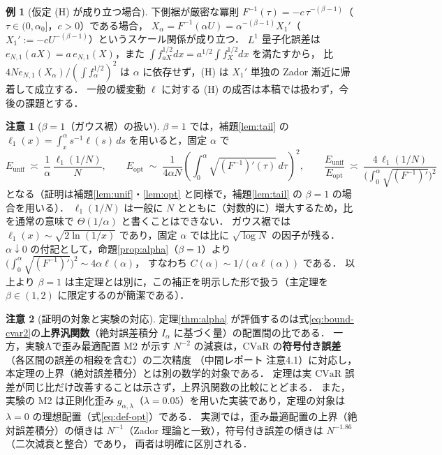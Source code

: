 \documentclass[a4paper,10pt]{jsarticle}
\theoremstyle{definition}
\newtheorem{remark}{注意}[section]
\newtheorem{example}{例}[section]
\newcommand{\CVaR}{\mathrm{CVaR}}
\newcommand{\Finv}{F^{-1}}
\newcommand{\eN}{e_{N,1}}
\newcommand{\Eunif}{E_{\mathrm{unif}}}
\newcommand{\Eopt}{E_{\mathrm{opt}}}
\begin{document}
\begin{example}[仮定 (H) が成り立つ場合]
\label{ex:powertail}
下側裾が厳密な冪則 $\Finv(\tau)=-c\,\tau^{-(\beta-1)}$（$\tau\in(0,\alpha_0]$，$c>0$）である場合，
$X_\alpha=\Finv(\alpha U)=\alpha^{-(\beta-1)}X_1'$（$X_1':=-cU^{-(\beta-1)}$）というスケール関係が成り立つ．
$L^1$ 量子化誤差は $\eN(aX)=a\,\eN(X)$，また $\int f_{aX}^{1/2}dx=a^{1/2}\int f_X^{1/2}dx$ を満たすから，
比 $4N\eN(X_\alpha)/(\int f_\alpha^{1/2})^2$ は $\alpha$ に依存せず，(H) は $X_1'$ 単独の Zador 漸近に帰着して成立する．
一般の緩変動 $\ell$ に対する (H) の成否は本稿では扱わず，今後の課題とする．
\end{example}

\begin{remark}[$\beta=1$（ガウス裾）の扱い]
\label{rem:beta1}
$\beta=1$ では，補題\ref{lem:tail} の $\ell_1(x)=\int_x^\alpha s^{-1}\ell(s)\,ds$ を用いると，固定 $\alpha$ で
\begin{equation*}
  \Eunif\;\asymp\;\frac1\alpha\,\frac{\ell_1(1/N)}{N},\qquad
  \Eopt\;\sim\;\frac1{4\alpha N}\left(\int_0^\alpha\sqrt{(\Finv)'(\tau)}\,d\tau\right)^{2},\qquad
  \frac{\Eunif}{\Eopt}\;\asymp\;\frac{4\,\ell_1(1/N)}{\bigl(\int_0^\alpha\sqrt{(\Finv)'}\bigr)^{2}}
\end{equation*}
となる（証明は補題\ref{lem:unif}・\ref{lem:opt} と同様で，補題\ref{lem:tail} の $\beta=1$ の場合を用いる）．
$\ell_1(1/N)$ は一般に $N$ とともに（対数的に）増大するため，比を通常の意味で $\Theta(1/\alpha)$ と書くことはできない．
ガウス裾では $\ell_1(x)\sim\sqrt{2\ln(1/x)}$ であり，固定 $\alpha$ では比に $\sqrt{\log N}$ の因子が残る．
$\alpha\downarrow0$ の付記として，命題\ref{prop:alpha}（$\beta=1$）より $\bigl(\int_0^\alpha\sqrt{(\Finv)'}\bigr)^2\sim4\alpha\ell(\alpha)$，
すなわち $C(\alpha)\sim1/(\alpha\ell(\alpha))$ である．
以上より $\beta=1$ は主定理とは別に，この補正を明示した形で扱う（主定理を $\beta\in(1,2)$ に限定するのが簡潔である）．
\end{remark}

\begin{remark}[証明の対象と実験の対応]
\label{rem:scope}
定理\ref{thm:alpha} が評価するのは式\eqref{eq:bound-cvar2}の\textbf{上界汎関数}（絶対誤差積分 $I_\alpha$ に基づく量）の配置間の比である．
一方，実験Aで歪み最適配置 M2 が示す $N^{-2}$ の減衰は，$\CVaR$ の\textbf{符号付き誤差}（各区間の誤差の相殺を含む）の二次精度
（中間レポート 注意4.1）に対応し，本定理の上界（絶対誤差積分）とは別の数学的対象である．
定理は実 $\CVaR$ 誤差が同じ比だけ改善することは示さず，上界汎関数の比較にとどまる．
また，実験の M2 は正則化歪み $g_{\alpha,\lambda}$（$\lambda=0.05$）を用いた実装であり，定理の対象は $\lambda=0$ の理想配置（式\eqref{eq:def-opt}）である．
実測では，歪み最適配置の上界（絶対誤差積分）の傾きは $N^{-1}$（Zador 理論と一致），符号付き誤差の傾きは $N^{-1.86}$（二次減衰と整合）であり，
両者は明確に区別される．
\end{remark}
\end{document}
